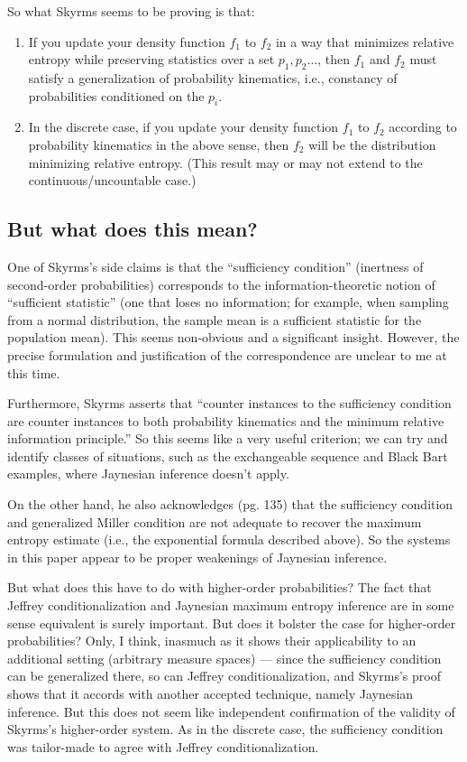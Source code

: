 \documentclass[letterpaper,12pt]{article}
\begin{document}
So what Skyrms seems to be proving is that:
\begin{enumerate}
\item
If you update your density function $f_1$ to $f_2$ in a way that minimizes relative entropy while preserving statistics over a set $p_1, p_2 \ldots$, then $f_1$ and $f_2$ must satisfy a generalization of probability kinematics, i.e., constancy of probabilities conditioned on the $p_i$.
\item
In the discrete case, if you update your density function $f_1$ to $f_2$ according to probability kinematics in the above sense, then $f_2$ will be the distribution minimizing relative entropy. (This result may or may not extend to the continuous/uncountable case.)
\end{enumerate}

\subsection{But what does this mean?}
One of Skyrms's side claims is that the ``sufficiency condition'' (inertness of second-order probabilities) corresponds to the information-theoretic notion of ``sufficient statistic'' (one that loses no information; for example, when sampling from a normal distribution, the sample mean is a sufficient statistic for the population mean). This seems non-obvious and a significant insight. However, the precise formulation and justification of the correspondence are unclear to me at this time.

Furthermore, Skyrms asserts that ``counter instances to the sufficiency condition are counter instances to both probability kinematics and the minimum relative information principle.'' So this seems like a very useful criterion; we can try and identify classes of situations, such as the exchangeable sequence and Black Bart examples, where Jaynesian inference doesn't apply.

On the other hand, he also acknowledges (pg. 135) that the sufficiency condition and generalized Miller condition are not adequate to recover the maximum entropy estimate (i.e., the exponential formula described above). So the systems in this paper appear to be proper weakenings of Jaynesian inference.

But what does this have to do with higher-order probabilities? The fact that Jeffrey conditionalization and Jaynesian maximum entropy inference are in some sense equivalent is surely important. But does it bolster the case for higher-order probabilities? Only, I think, inasmuch as it shows their applicability to an additional setting (arbitrary measure spaces) --- since the sufficiency condition can be generalized there, so can Jeffrey conditionalization, and Skyrms's proof shows that it accords with another accepted technique, namely Jaynesian inference. But this does not seem like independent confirmation of the validity of Skyrms's higher-order system. As in the discrete case, the sufficiency condition was tailor-made to agree with Jeffrey conditionalization.
\end{document}
